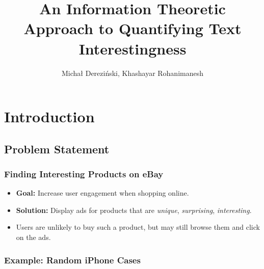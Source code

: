 \documentclass{beamer}
\title[Quantifying Text Interestingness]{An Information Theoretic
    Approach to Quantifying Text Interestingness}
\author{Michał Dereziński, Khashayar Rohanimanesh}
\begin{document}
\begin{frame}
  \titlepage
\end{frame}

\linespread{1.3}

\section{Introduction}
\subsection{Problem Statement}
\begin{frame}
\frametitle{Finding Interesting Products on eBay}
\begin{itemize}
\item {\bf Goal:} Increase user engagement when shopping online.
\item {\bf Solution:} Display ads for products that are {\em unique},
  {\em surprising}, {\em interesting}. 
\item Users are unlikely to buy such a product, but may still browse
  them and click on the ads. 
\end{itemize}
\end{frame}

\begin{frame}
\frametitle{Example: Random iPhone Cases}
\begin{figure}
\centering
{}
\label{fig:boring}
\end{figure}
\end{frame}
\end{document}
